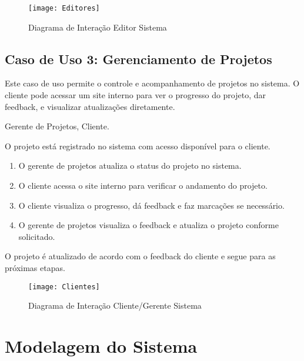 \begin{figure}[ht]
    \centering
    \texttt{[image: Editores]}
    \caption{Diagrama de Interação Editor Sistema}
    \label{fig:diagram1}
\end{figure}

\subsection{Caso de Uso 3: Gerenciamento de Projetos}
\begin{description}[style=nextline]
    \item[Descrição:] Este caso de uso permite o controle e acompanhamento de projetos no sistema. O cliente pode acessar um site interno para ver o progresso do projeto, dar feedback, e visualizar atualizações diretamente.
    
    \item[Atores:] Gerente de Projetos, Cliente.
    
    \item[Pré-condição:] O projeto está registrado no sistema com acesso disponível para o cliente.
    
    \item[Sequência de Ações:]
    \begin{enumerate}
        \item O gerente de projetos atualiza o status do projeto no sistema.
        \item O cliente acessa o site interno para verificar o andamento do projeto.
        \item O cliente visualiza o progresso, dá feedback e faz marcações se necessário.
        \item O gerente de projetos visualiza o feedback e atualiza o projeto conforme solicitado.
    \end{enumerate}
    
    \item[Pós-condição:] O projeto é atualizado de acordo com o feedback do cliente e segue para as próximas etapas.
\end{description}

\begin{figure}[ht]
    \centering
    \texttt{[image: Clientes]}
    \caption{Diagrama de Interação Cliente/Gerente Sistema}
    \label{fig:diagram1}
\end{figure}

\pagebreak
\newpage

\section{Modelagem do Sistema}

